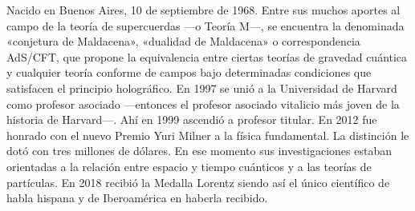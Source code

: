 \begin{parchment}
{Nacido en Buenos Aires, 10 de septiembre de 1968. Entre sus muchos aportes al campo de la teoría de supercuerdas —o Teoría M—, se encuentra la denominada «conjetura de Maldacena», «dualidad de Maldacena» o correspondencia AdS/CFT, que propone la equivalencia entre ciertas teorías de gravedad cuántica y cualquier teoría conforme de campos bajo determinadas condiciones que satisfacen el principio holográfico. En 1997 se unió a la Universidad de Harvard como profesor asociado —entonces el profesor asociado vitalicio más joven de la historia de Harvard—. Ahí en 1999 ascendió a profesor titular. En 2012 fue honrado con el nuevo Premio Yuri Milner a la física fundamental. La distinción le dotó con tres millones de dólares. En ese momento sus investigaciones estaban orientadas a la relación entre espacio y tiempo cuánticos y a las teorías de partículas. En 2018 recibió la Medalla Lorentz siendo así el único científico de habla hispana y de Iberoamérica en haberla recibido.}
\end{parchment}


